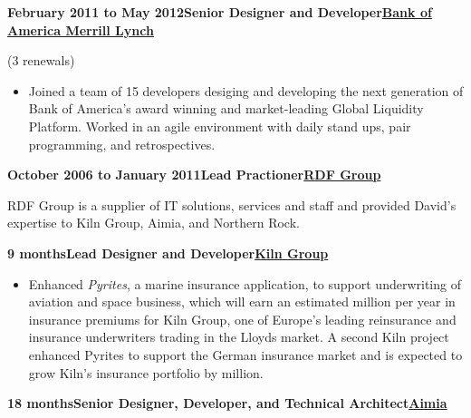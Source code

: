 \documentclass[a4paper,12pt]{article}
\newcommand{\head}[1]{\begin{center}{\large{\textbf{\sc{#1}}}}\nopagebreak\end{center}}
\newcommand{\clientwork}[3]{\textbf{#1\hfill#3\hfill#2}\nopagebreak}
\newcommand{\renewals}[2]{(#2)\nopagebreak}
\begin{document}
\head{Career History}

\clientwork{February 2011 to May 2012}{\href{http://corp.bankofamerica.com/}{Bank of America Merrill Lynch}}{Senior Designer and Developer}

\renewals{15 months}{3 renewals}

\begin{itemize}


\item Joined a team of 15 developers desiging and developing the next generation of Bank of America's award winning and market-leading Global Liquidity Platform. Worked in an agile environment with daily stand ups, pair programming, and retrospectives.

\end{itemize}

\clientwork{October 2006 to January 2011}{\href{http://www.rdfgroup.com/}{RDF Group}}{Lead Practioner}

RDF Group is a supplier of IT solutions, services and staff and provided David's expertise to Kiln Group, Aimia, and Northern Rock.

\clientwork{9 months}{\href{http://kilngroup.com/}{Kiln Group}}{Lead Designer and Developer}

\begin{itemize}

\item Enhanced \emph{Pyrites}, a marine insurance application, to support underwriting of aviation and space business, which will earn an estimated  million per year in insurance premiums for Kiln Group, one of Europe's leading reinsurance and insurance underwriters trading in the Lloyds market. A second Kiln project enhanced Pyrites to support the German insurance market and is expected to grow  Kiln's insurance portfolio by  million.

\end{itemize}

\clientwork{18 months}{\href{http://www.aimia.com/}{Aimia}}{Senior Designer, Developer, and Technical Architect}
\end{document}
